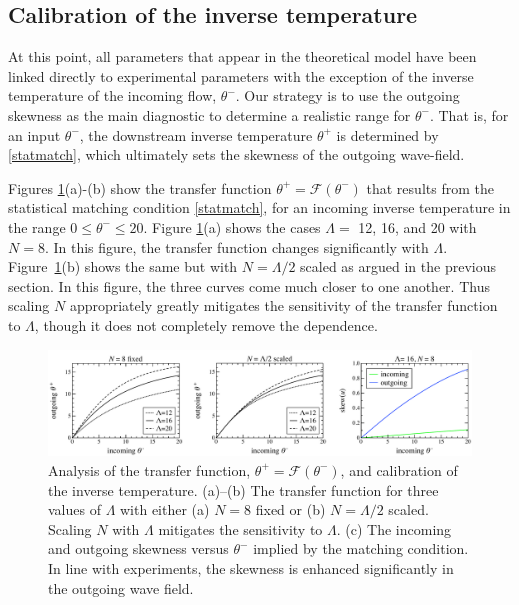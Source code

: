 \documentclass[11pt]{article}
\newcommand{\lamfac}{N}
\newcommand{\thup}{\theta^{-}}
\newcommand{\thdn}{\theta^{+}}
\newcommand{\transf}{\mathcal{F}}
\begin{document}
\subsection{Calibration of the inverse temperature}

At this point, all parameters that appear in the theoretical model have been linked directly to experimental parameters with the exception of the inverse temperature of the incoming flow, $\thup$.
Our strategy is to use the outgoing skewness as the main diagnostic to determine a realistic range for $\thup$. That is, for an input $\thup$, the downstream inverse temperature $\thdn$ is determined by \eqref{statmatch}, which ultimately sets the skewness of the outgoing wave-field.

	Figures \ref{transfig}(a)-(b) show the transfer function $\thdn = \transf(\thup)$ that results from the statistical matching condition \eqref{statmatch}, for an incoming inverse temperature in the range $0 \le \thup \le 20$. Figure \ref{transfig}(a) shows the cases $\Lambda = $ 12, 16, and 20 with $\lamfac = 8$. In this figure, the transfer function changes significantly with $\Lambda$. Figure~\ref{transfig}(b) shows the same but with $\lamfac = \Lambda/2$ scaled as argued in the previous section. In this figure, the three curves come much closer to one another. Thus scaling $\lamfac$ appropriately greatly mitigates the sensitivity of the transfer function to $\Lambda$, though it does not completely remove the dependence.

\begin{figure}%
\begin{center}
\includegraphics[width = 0.99 \linewidth]{Figs/transfig.pdf}
\caption{
Analysis of the transfer function, $\thdn = \transf \left( \thup \right)$, and calibration of the inverse temperature. (a)--(b) The transfer function for three values of $\Lambda$ with either (a) $\lamfac = 8$ fixed or (b) $\lamfac = \Lambda/2$ scaled. Scaling $\lamfac$ with $\Lambda$ mitigates the sensitivity to $\Lambda$. (c) The incoming and outgoing skewness versus $\thup$ implied by the matching condition. In line with experiments, the skewness is enhanced significantly in the outgoing wave field.
}
\label{transfig}
\end{center}
\end{figure}
 
\end{document}
